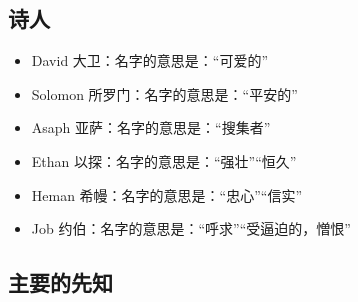 \subsection{诗人}
\begin{itemize}
\itemsep-.45em
\item David  大卫：名字的意思是：“可爱的”
\item Solomon  所罗门：名字的意思是：“平安的”
\item Asaph  亚萨：名字的意思是：“搜集者”
\item Ethan  以探：名字的意思是：“强壮”“恒久”
\item Heman  希幔：名字的意思是：“忠心”“信实”
\item Job  约伯：名字的意思是：“呼求”“受逼迫的，憎恨”
\end{itemize}

\subsection{主要的先知}
